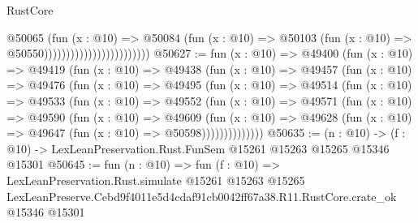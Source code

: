 \begin{lexlean}{RustCore}
\begin{coremodule}
                                            @50065
                                              (fun (x : @10) =>
                                              @50084
                                                (fun (x : @10) =>
                                                @50103
                                                  (fun (x : @10) => @50550))))))))))))))))))))))))
@50627 := fun (x : @10) =>
  @49400
    (fun (x : @10) =>
    @49419
      (fun (x : @10) =>
      @49438
        (fun (x : @10) =>
        @49457
          (fun (x : @10) =>
          @49476
            (fun (x : @10) =>
            @49495
              (fun (x : @10) =>
              @49514
                (fun (x : @10) =>
                @49533
                  (fun (x : @10) =>
                  @49552
                    (fun (x : @10) =>
                    @49571
                      (fun (x : @10) =>
                      @49590
                        (fun (x : @10) =>
                        @49609
                          (fun (x : @10) =>
                          @49628 (fun (x : @10) => @49647 (fun (x : @10) => @50598))))))))))))))
@50635 := (n : @10) ->
  (f : @10) -> LexLeanPreservation.Rust.FunSem @15261 @15263 @15265 @15346 @15301
@50645 := fun (n : @10) =>
  fun (f : @10) =>
  LexLeanPreservation.Rust.simulate
    @15261
    @15263
    @15265
    LexLeanPreserve.Cebd9f4011e5d4cdaf91cb0042ff67a38.R11.RustCore.crate_ok
    @15346
    @15301
\end{coremodule}
\end{lexlean}
